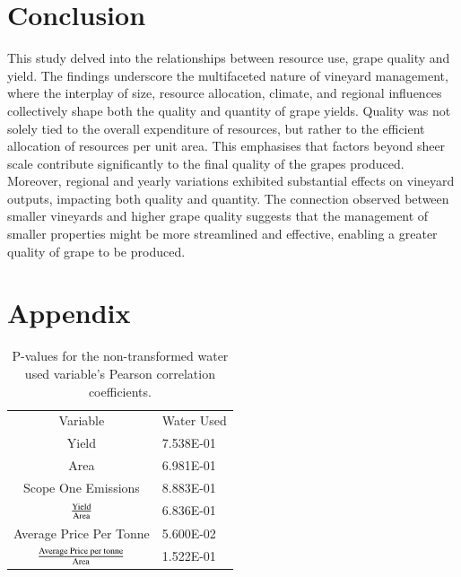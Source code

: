 \documentclass[review,12pt,authoryear]{elsarticle}
\begin{document}
\begin{linenumbers}
\section{Conclusion}

This study delved into the relationships between resource use, grape quality and yield. The findings underscore the multifaceted nature of vineyard management, where the interplay of size, resource allocation, climate, and regional influences collectively shape both the quality and quantity of grape yields. Quality was not solely tied to the overall expenditure of resources, but rather to the efficient allocation of resources per unit area. This emphasises that factors beyond sheer scale contribute significantly to the final quality of the grapes produced. Moreover, regional and yearly variations exhibited substantial effects on vineyard outputs, impacting both quality and  quantity. The connection observed between smaller vineyards and higher grape quality suggests that the management of smaller properties might be more streamlined and effective, enabling a greater quality of grape to be produced.





 \appendix

\section{Appendix}
\par

\begin{table}[]
      \caption{P-values for the non-transformed water used variable's Pearson correlation coefficients.}
      \begin{tabular}{cl}
      Variable                                           & Water Used \\
      Yield                                              & 7.538E-01  \\
      Area                                               & 6.981E-01  \\
      Scope One Emissions                                & 8.883E-01  \\
      $\textrm{Yield}\over\textrm{Area}$                     & 6.836E-01  \\
      Average Price Per Tonne                            & 5.600E-02  \\
      ${\textrm{Average Price per tonne}\over\textrm{Area}}$ & 1.522E-01 
      \end{tabular}
\end{table}



\end{linenumbers}
\end{document}
